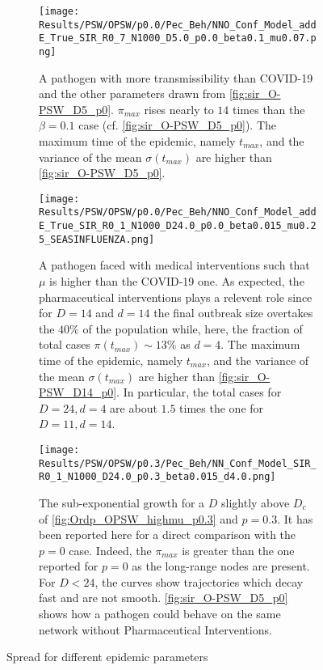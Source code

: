 \documentclass[a4paper,10pt,twoside]{book} %
\theoremstyle{definition}
\begin{document}
\begin{figure}[p]
	\centering
	\begin{subfigure}{\linewidth}
		\centering
		\texttt{[image: Results/PSW/OPSW/p0.0/Pec\_Beh/NNO\_Conf\_Model\_addE\_True\_SIR\_R0\_7\_N1000\_D5.0\_p0.0\_beta0.1\_mu0.07.png]}
		\caption{A pathogen with more transmissibility than COVID-19 and the other parameters drawn from \autoref{fig:sir_O-PSW_D5_p0}. $\pi_{max}$ rises nearly to $ 14$ times than the $ \beta = 0.1$ case (cf. \autoref{fig:sir_O-PSW_D5_p0}). The maximum time of the epidemic, namely $t_{max} $, and the variance of the mean $\sigma(t_{max})$ are higher than \autoref{fig:sir_O-PSW_D5_p0}.}
		\label{fig:sir_O-PSW_D5_d14_b0.1}
	\end{subfigure}
	\vfill
	\begin{subfigure}[t]{\linewidth}
		\centering
		\texttt{[image: Results/PSW/OPSW/p0.0/Pec\_Beh/NNO\_Conf\_Model\_addE\_True\_SIR\_R0\_1\_N1000\_D24.0\_p0.0\_beta0.015\_mu0.25\_SEASINFLUENZA.png]}
		\caption{A pathogen faced with medical interventions such that $\mu$ is higher than the COVID-19 one. As expected, the pharmaceutical interventions plays a relevent role since for $ D = 14$ and $ d = 14$ the final outbreak size overtakes the $40 \% $ of the population while, here, the fraction of total cases $\pi(t_{max})\sim 13\%$ as $ d = 4$. The maximum time of the epidemic, namely $t_{max} $, and the variance of the mean $\sigma(t_{max})$ are higher than \autoref{fig:sir_O-PSW_D14_p0}. In particular, the total cases for $ D = 24, d = 4$ are about $1.5$ times the one for $D = 11, d = 14$.}
		\label{fig:sir_O-PSW_D24_d4}
	\end{subfigure}
	\vfill
	\begin{subfigure}{\linewidth}
		\centering
		\texttt{[image: Results/PSW/OPSW/p0.3/Pec\_Beh/NN\_Conf\_Model\_SIR\_R0\_1\_N1000\_D24.0\_p0.3\_beta0.015\_d4.0.png]}
		\caption{The sub-exponential growth for a $D$ slightly above $D_c$ of \autoref{fig:Ordp_OPSW_highmu_p0.3} and $p = 0.3.$ It has been reported here for a direct comparison with the $p = 0$ case. Indeed, the $ \pi_{max} $ is greater than the one reported for $ p= 0$ as the long-range nodes are present. For $ D < 24$, the curves show trajectories which decay fast and are not smooth. \autoref{fig:sir_O-PSW_D5_p0} shows how a pathogen could behave on the same network without Pharmaceutical Interventions.}
		\label{fig:sir_O-PSW_D24_d4_p0.3}
	\end{subfigure}
	\caption{Spread for different epidemic parameters}
	\label{fig:OPSW_COVID_p0.3}
\end{figure}
\end{document}

